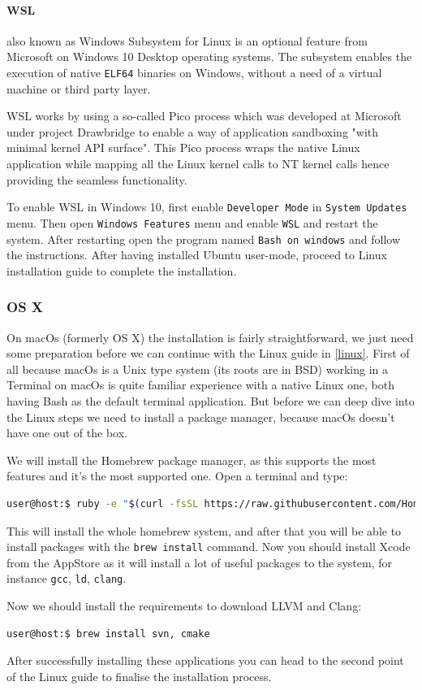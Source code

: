 \paragraph{WSL}
\par also known as Windows Subsystem for Linux is an optional feature from Microsoft on Windows 10 Desktop operating systems. The subsystem enables the execution of native \verb|ELF64| binaries\cite{wsl_overview} on Windows, without a need of a virtual machine or third party layer. \medskip
\par WSL works by using a so-called Pico process which was developed at Microsoft under project Drawbridge\cite{project_drawbridge} to enable a way of application sandboxing "with minimal kernel API surface"\cite{project_drawbridge}. This Pico process wraps the native Linux application while mapping all the Linux kernel calls to NT kernel calls hence providing the seamless functionality. \medskip
\par To enable WSL in Windows 10, first enable \verb|Developer Mode| in \verb|System Updates| menu. Then open \verb|Windows Features| menu and enable \verb|WSL| and restart the system. After restarting open the program named \verb|Bash on windows| and follow the instructions. After having installed Ubuntu user-mode, proceed to Linux installation guide to complete the installation.
\subsubsection{OS X}
\par On macOs (formerly OS X) the installation is fairly straightforward, we just need some preparation before we can continue with the Linux guide in \ref{linux}. First of all because macOs is a Unix type system (its roots are in BSD) working in a Terminal on macOs is quite familiar experience with a native Linux one, both having Bash as the default terminal application. But before we can deep dive into the Linux steps we need to install a package manager, because macOs doesn't have one out of the box.
\par We will install the Homebrew\cite{homebrew_homepage} package manager, as this supports the most features and it's the most supported one. Open a terminal and type: 
\begin{lstlisting}[language=bash, frame=single]
user@host:$ ruby -e "$(curl -fsSL https://raw.githubusercontent.com/Homebrew/install/master/install)"
\end{lstlisting}
\par This will install the whole homebrew system, and after that you will be able to install packages with the \verb|brew install| command. Now you should install Xcode from the AppStore as it will install a lot of useful packages to the system, for instance \verb|gcc|, \verb|ld|, \verb|clang|.
\par Now we should install the requirements to download LLVM and Clang:
\begin{lstlisting}[language=bash, frame=single]
user@host:$ brew install svn, cmake
\end{lstlisting}
\par After successfully installing these applications you can head to the second point of the Linux guide to finalise the installation process.
